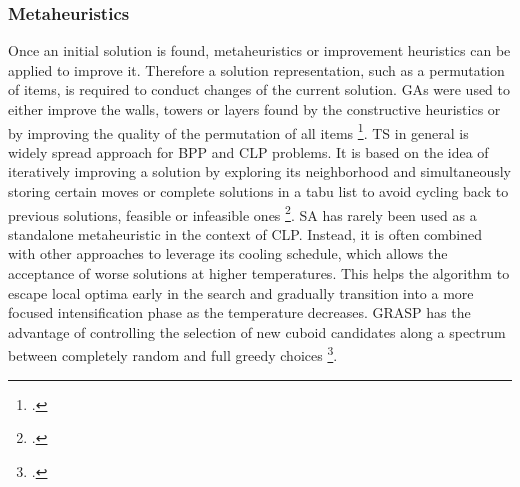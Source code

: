 \subsubsection{Metaheuristics}
Once an initial solution is found, metaheuristics or improvement heuristics can be applied
to improve it. Therefore a solution representation, such as a permutation of items, is required
to conduct changes of the current solution. \gls{GA}s were
used to either improve the walls, towers or layers found by the constructive heuristics
or by improving the quality of the permutation of all items \footcite[cf.][]{gehring_genetic_1997,bortfeldt_hybrid_2001}.
\gls{TS} in general is widely spread approach for \gls{BPP} and \gls{CLP} problems. It is based on
the idea of iteratively improving a solution by exploring its neighborhood and simultaneously
storing certain moves or complete solutions in a tabu list to avoid cycling back to
previous solutions, feasible or infeasible ones \footcite[cf.][pp. 344--345]{gendreau_tabu_2006}. \gls{SA} has rarely been used as a
standalone metaheuristic in the context of \gls{CLP}. Instead, it is often combined
with other approaches to leverage its cooling schedule, which allows the acceptance of
worse solutions at higher temperatures. This helps the algorithm to escape local optima
early in the search and gradually transition into a more focused intensification phase as
the temperature decreases. \gls{GRASP} has the advantage of controlling the selection of new
cuboid candidates along a spectrum between completely random and full greedy choices \footcite[cf.][]{moura_grasp_2005}.

